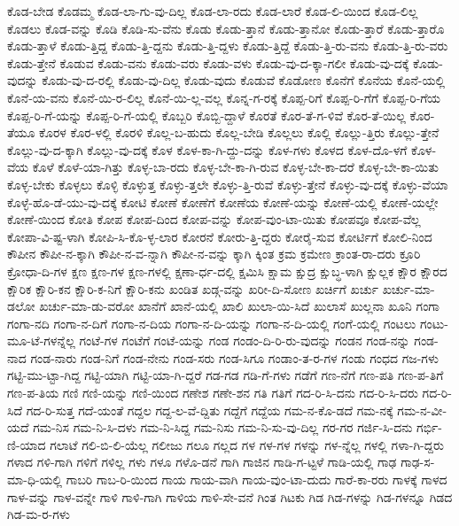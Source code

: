 {ಕೊಡ-ಬೇಡ
ಕೊಡಮ್ಮ
ಕೊಡ-ಲಾ-ಗು-ವು-ದಿಲ್ಲ
ಕೊಡ-ಲಾ-ರದು
ಕೊಡ-ಲಾರೆ
ಕೊಡ-ಲಿ-ಯಿಂದ
ಕೊಡ-ಲಿಲ್ಲ
ಕೊಡಲು
ಕೊಡ-ವನ್ನು
ಕೊಡಿ
ಕೊಡಿ-ಸು-ವೆನು
ಕೊಡು
ಕೊಡು-ತ್ತಾನೆ
ಕೊಡು-ತ್ತಾನೋ
ಕೊಡು-ತ್ತಾರೆ
ಕೊಡು-ತ್ತಾರೊ
ಕೊಡು-ತ್ತಾಳೆ
ಕೊಡು-ತ್ತಿದ್ದ
ಕೊಡು-ತ್ತಿ-ದ್ದನು
ಕೊಡು-ತ್ತಿ-ದ್ದಳು
ಕೊಡು-ತ್ತಿದ್ದೆ
ಕೊಡು-ತ್ತಿ-ರು-ವನು
ಕೊಡು-ತ್ತಿ-ರು-ವರು
ಕೊಡು-ತ್ತೇನೆ
ಕೊಡುವ
ಕೊಡು-ವನು
ಕೊಡು-ವರು
ಕೊಡು-ವಳು
ಕೊಡು-ವು-ದ-ಕ್ಕಾ-ಗಲೀ
ಕೊಡು-ವು-ದಕ್ಕೆ
ಕೊಡು-ವುದನ್ನು
ಕೊಡು-ವು-ದ-ರಲ್ಲಿ
ಕೊಡು-ವು-ದಿಲ್ಲ
ಕೊಡು-ವುದು
ಕೊಡುವೆ
ಕೊಡೋಣ
ಕೊನೆಗೆ
ಕೊನೆಯ
ಕೊನೆ-ಯಲ್ಲಿ
ಕೊನೆ-ಯ-ವನು
ಕೊನೆ-ಯಿ-ರ-ಲಿಲ್ಲ
ಕೊನೆ-ಯಿ-ಲ್ಲ-ವಲ್ಲ
ಕೊನ್ನ-ಗ-ರಕ್ಕೆ
ಕೊಪ್ಪ-ರಿಗೆ
ಕೊಪ್ಪ-ರಿ-ಗೆಗೆ
ಕೊಪ್ಪ-ರಿ-ಗೆಯ
ಕೊಪ್ಪ-ರಿ-ಗೆ-ಯನ್ನು
ಕೊಪ್ಪ-ರಿ-ಗೆ-ಯಲ್ಲಿ
ಕೊಬ್ಬರಿ
ಕೊಬ್ಬಿ-ದ್ದಾಳೆ
ಕೊರತೆ
ಕೊರ-ತೆ-ಗ-ಳಿವೆ
ಕೊರ-ತೆ-ಯಿಲ್ಲ
ಕೊರ-ತೆಯೂ
ಕೊರಳ
ಕೊರ-ಳಲ್ಲಿ
ಕೊರಳಿ
ಕೊಲ್ಲ-ಬ-ಹುದು
ಕೊಲ್ಲ-ಬೇಡಿ
ಕೊಲ್ಲಲು
ಕೊಲ್ಲಿ
ಕೊಲ್ಲು-ತ್ತಿರು
ಕೊಲ್ಲು-ತ್ತೇನೆ
ಕೊಲ್ಲು-ವು-ದ-ಕ್ಕಾಗಿ
ಕೊಲ್ಲು-ವು-ದಕ್ಕೆ
ಕೊಳ
ಕೊಳ-ಕಾ-ಗಿ-ದ್ದು-ದನ್ನು
ಕೊಳ-ಗಳು
ಕೊಳದ
ಕೊಳ-ದೊ-ಳಗೆ
ಕೊಳ-ವೆಯ
ಕೊಳೆ
ಕೊಳೆ-ಯಾ-ಗಿತ್ತು
ಕೊಳ್ಳ-ಬಾ-ರದು
ಕೊಳ್ಳ-ಬೇ-ಕಾ-ಗಿ-ರುವ
ಕೊಳ್ಳ-ಬೇ-ಕಾ-ದರೆ
ಕೊಳ್ಳ-ಬೇ-ಕಾ-ಯಿತು
ಕೊಳ್ಳ-ಬೇಕು
ಕೊಳ್ಳಲು
ಕೊಳ್ಳಿ
ಕೊಳ್ಳುತ್ತ
ಕೊಳ್ಳು-ತ್ತಲೇ
ಕೊಳ್ಳು-ತ್ತಿ-ರುವೆ
ಕೊಳ್ಳು-ತ್ತೇನೆ
ಕೊಳ್ಳು-ವು-ದಕ್ಕೆ
ಕೊಳ್ಳು-ವೆಯಾ
ಕೊಳ್ಳೆ-ಹೊ-ಡೆ-ಯು-ವು-ದಕ್ಕೆ
ಕೋಟಿ
ಕೋಣೆ
ಕೋಣೆಗೆ
ಕೋಣೆಯ
ಕೋಣೆ-ಯನ್ನು
ಕೋಣೆ-ಯಲ್ಲಿ
ಕೋಣೆ-ಯಲ್ಲೇ
ಕೋಣೆ-ಯಿಂದ
ಕೋತಿ
ಕೋಪ
ಕೋಪ-ದಿಂದ
ಕೋಪ-ವನ್ನು
ಕೋಪ-ವುಂ-ಟಾ-ಯಿತು
ಕೋಪವೂ
ಕೋಪ-ವೆಲ್ಲ
ಕೋಪಾ-ವಿ-ಷ್ಟ-ಳಾಗಿ
ಕೋಪಿ-ಸಿ-ಕೊ-ಳ್ಳ-ಲಾರ
ಕೋರನೆ
ಕೋರು-ತ್ತಿ-ದ್ದರು
ಕೋರೈ-ಸುವ
ಕೋರ್ಟಿಗೆ
ಕೋಲಿ-ನಿಂದ
ಕೌಪೀನ
ಕೌಪೀ-ನ-ಕ್ಕಾಗಿ
ಕೌಪೀ-ನ-ವ-ನ್ನಾಗಿ
ಕೌಪೀ-ನ-ವನ್ನು
ಕ್ಕಾಗಿ
ಕ್ಕಿಂತ
ಕ್ರಮ
ಕ್ರಮೇಣ
ಕ್ರಾಂತ-ರಾ-ದರು
ಕ್ರೂರಿ
ಕ್ರೋಧಾ-ದಿ-ಗಳ
ಕ್ಷಣ
ಕ್ಷಣ-ಗಳ
ಕ್ಷಣ-ಗಳಲ್ಲಿ
ಕ್ಷಣಾ-ರ್ಧ-ದಲ್ಲಿ
ಕ್ಷಮಿಸಿ
ಕ್ಷಾಮ
ಕ್ಷುದ್ರ
ಕ್ಷುಬ್ಧ-ಳಾಗಿ
ಕ್ಷುಲ್ಲಕ
ಕ್ಷೌರ
ಕ್ಷೌರದ
ಕ್ಷೌರಿಕ
ಕ್ಷೌರಿ-ಕನ
ಕ್ಷೌರಿ-ಕ-ನಿಗೆ
ಕ್ಷೌರಿ-ಕನು
ಖಂಡಿತ
ಖಡ್ಗ-ವನ್ನು
ಖರೀ-ದಿ-ಸೋಣ
ಖರ್ಚಿಗೆ
ಖರ್ಚು
ಖರ್ಚು-ಮಾ-ಡಲೋ
ಖರ್ಚು-ಮಾ-ಡು-ವರೋ
ಖಾನೆಗೆ
ಖಾನೆ-ಯಲ್ಲಿ
ಖಾಲಿ
ಖುಲಾ-ಯಿ-ಸಿದೆ
ಖುಲಾಸೆ
ಖುಲ್ಲನಾ
ಖೂನಿ
ಗಂಗಾ
ಗಂಗಾ-ನದಿ
ಗಂಗಾ-ನ-ದಿಗೆ
ಗಂಗಾ-ನ-ದಿಯ
ಗಂಗಾ-ನ-ದಿ-ಯನ್ನು
ಗಂಗಾ-ನ-ದಿ-ಯಲ್ಲಿ
ಗಂಗೆ-ಯಲ್ಲಿ
ಗಂಟಲು
ಗಂಟು-ಮೂ-ಟೆ-ಗಳನ್ನೆಲ್ಲ
ಗಂಟೆ-ಗಳ
ಗಂಟೆಗೆ
ಗಂಟೆ-ಯನ್ನು
ಗಂಡ
ಗಂಡಂ-ದಿ-ರಿ-ರು-ವುದನ್ನು
ಗಂಡನ
ಗಂಡ-ನನ್ನು
ಗಂಡ-ನಾದ
ಗಂಡ-ನಾರು
ಗಂಡ-ನಿಗೆ
ಗಂಡ-ನೇನು
ಗಂಡ-ಸರು
ಗಂಡ-ಸಿಗೂ
ಗಂಡಾಂ-ತ-ರ-ಗಳ
ಗಂಡು
ಗಂಧದ
ಗಜ-ಗಳು
ಗಟ್ಟಿ-ಮು-ಟ್ಟಾ-ಗಿದ್ದ
ಗಟ್ಟಿ-ಯಾಗಿ
ಗಟ್ಟಿ-ಯಾ-ಗಿ-ದ್ದರೆ
ಗಡ-ಗಡ
ಗಡಿ-ಗೆ-ಗಳು
ಗಡೆಗೆ
ಗಣ-ನೆಗೆ
ಗಣ-ಪತಿ
ಗಣ-ಪ-ತಿಗೆ
ಗಣ-ಪ-ತಿಯ
ಗಣಿ
ಗಣಿ-ಯನ್ನು
ಗಣಿ-ಯಿಂದ
ಗಣೇಶ
ಗಣೇ-ಶನ
ಗತಿ
ಗತಿಗೆ
ಗದ-ರಿ-ಸಿ-ದನು
ಗದ-ರಿ-ಸಿ-ದರು
ಗದ-ರಿ-ಸಿದೆ
ಗದ-ರಿ-ಸುತ್ತ
ಗದೆ-ಯಂತೆ
ಗದ್ದಲ
ಗದ್ದ-ಲ-ವೆ-ದ್ದಿತು
ಗದ್ದೆಗೆ
ಗದ್ದೆಯ
ಗಮ-ನ-ಕೊ-ಡದೆ
ಗಮ-ನಕ್ಕೆ
ಗಮ-ನ-ವೀ-ಯದೆ
ಗಮ-ನಿಸ
ಗಮ-ನಿ-ಸಿ-ದಳು
ಗಮ-ನಿ-ಸಿದ್ದ
ಗಮ-ನಿಸು
ಗಮ-ನಿ-ಸು-ವು-ದಿಲ್ಲ
ಗರ-ಗರ
ಗರ್ಜಿ-ಸಿ-ದನು
ಗರ್ಭಿ-ಣಿ-ಯಾದ
ಗಲಾಟೆ
ಗಲಿ-ಬಿ-ಲಿ-ಯೆಲ್ಲ
ಗಲೀಜು
ಗಲೂ
ಗಲ್ಲದ
ಗಳ
ಗಳ-ಗಳ
ಗಳನ್ನು
ಗಳ-ನ್ನೆಲ್ಲ
ಗಳಲ್ಲಿ
ಗಳಾ-ಗಿ-ದ್ದರು
ಗಳಾದ
ಗಳಿ-ಗಾಗಿ
ಗಳಿಗೆ
ಗಳಿಲ್ಲ
ಗಳು
ಗಳೂ
ಗಳೊ-ಡನೆ
ಗಾಗಿ
ಗಾಜಿನ
ಗಾಡಿ-ಗ-ಟ್ಟಳೆ
ಗಾಡಿ-ಯಲ್ಲಿ
ಗಾಢ
ಗಾಢ-ಸ-ಮಾ-ಧಿ-ಯಲ್ಲಿ
ಗಾಬರಿ
ಗಾಬ-ರಿ-ಯಿಂದ
ಗಾಯ
ಗಾಯ-ವಾಗಿ
ಗಾಯ-ವುಂ-ಟಾ-ದುದು
ಗಾರೆ-ಕಾ-ರರು
ಗಾಳಕ್ಕೆ
ಗಾಳದ
ಗಾಳ-ವನ್ನು
ಗಾಳ-ವನ್ನೇ
ಗಾಳಿ
ಗಾಳಿ-ಗಾಗಿ
ಗಾಳಿಯ
ಗಾಳಿ-ಸೇ-ವನೆ
ಗಿಂತ
ಗಿಟಕು
ಗಿಡ
ಗಿಡ-ಗಳನ್ನು
ಗಿಡ-ಗಳನ್ನೂ
ಗಿಡದ
ಗಿಡ-ಮ-ರ-ಗಳು
}

